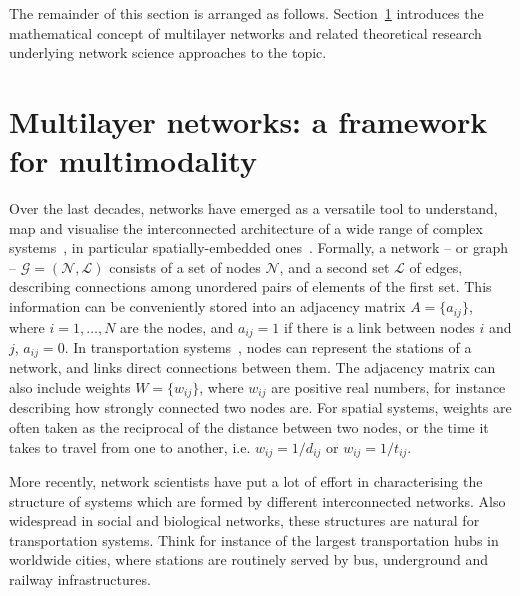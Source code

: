The remainder of this section is arranged as follows. Section~\ref{sec:multilayernetworks} introduces the mathematical concept of multilayer networks and related theoretical research underlying network science approaches to the topic. %

\section{Multilayer networks: a framework for multimodality}\label{sec:multilayernetworks}

Over the last decades, networks have emerged as a versatile tool to understand, map and visualise the interconnected architecture of a wide range of complex systems~\cite{albert2002statistical,dorogovtsev2002evolution, newman2003structure, boccaletti2006complex}, in particular spatially-embedded ones~\cite{barthelemy2011spatial}. Formally, a network -- or graph -- $\mathcal G = (\mathcal N, \mathcal L)$ consists of a set of nodes $\mathcal N$, and a second set $\mathcal L$ of edges, describing connections among unordered pairs of elements of the first set. This information can be conveniently stored into an adjacency matrix $A = \{a_{ij}\}$, where $i=1, \dots, N$ are the nodes, and $a_{ij}=1$ if there is a link between nodes $i$ and $j$, $a_{ij}=0$. In transportation systems~\cite{lin2013complex}, nodes can represent the stations of a network, and links direct connections between them. The adjacency matrix can also include weights $W = \{w_{ij}\}$, where $w_{ij}$ are positive real numbers, for instance describing how strongly connected two nodes are. For spatial systems, weights are often taken as the reciprocal of the distance between two nodes, or the time it takes to travel from one to another, i.e. $w_{ij}=1/d_{ij}$ or $w_{ij}=1/t_{ij}$.

More recently, network scientists have put a lot of effort in characterising the structure of systems which are formed by different interconnected networks. Also widespread in social and biological networks, these structures are natural for transportation systems. Think for instance of the largest transportation hubs in worldwide cities, where stations are routinely served by bus, underground and railway infrastructures.

